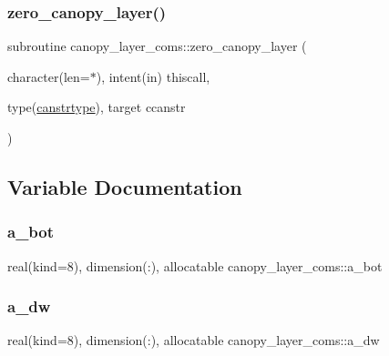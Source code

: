 \subsubsection{\texorpdfstring{zero\+\_\+canopy\+\_\+layer()}{zero\_canopy\_layer()}}
{\footnotesize\ttfamily subroutine canopy\+\_\+layer\+\_\+coms\+::zero\+\_\+canopy\+\_\+layer (\begin{DoxyParamCaption}\item[{character(len=$\ast$), intent(in)}]{thiscall,  }\item[{type(\hyperlink{structcanopy__layer__coms_1_1canstrtype}{canstrtype}), target}]{ccanstr }\end{DoxyParamCaption})}



\subsection{Variable Documentation}
\mbox{\label{namespacecanopy__layer__coms_a363ffecb6cfbea0e04ccff6048870913}} 
\subsubsection{\texorpdfstring{a\+\_\+bot}{a\_bot}}
{\footnotesize\ttfamily real(kind=8), dimension(\+:), allocatable canopy\+\_\+layer\+\_\+coms\+::a\+\_\+bot}

\mbox{\label{namespacecanopy__layer__coms_a2584d733078541cc3c82911c5178a352}} 
\subsubsection{\texorpdfstring{a\+\_\+dw}{a\_dw}}
{\footnotesize\ttfamily real(kind=8), dimension(\+:), allocatable canopy\+\_\+layer\+\_\+coms\+::a\+\_\+dw}

\mbox{\label{namespacecanopy__layer__coms_acef66a2794edd028cbebb25b81c94582}} 
